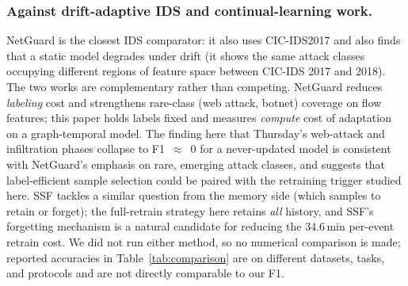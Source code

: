 \documentclass[twocolumn]{llncs}
\begin{document}
\subsubsection{Against drift-adaptive IDS and continual-learning work.} NetGuard
\cite{gupta2026netguard} is the closest IDS comparator: it also uses CIC-IDS2017 and also finds that
a static model degrades under drift (it shows the same attack classes occupying different regions of
feature space between CIC-IDS 2017 and 2018). The two works are complementary rather than competing.
NetGuard reduces \emph{labeling} cost and strengthens rare-class (web attack, botnet) coverage on
flow features; this paper holds labels fixed and measures \emph{compute} cost of adaptation on a
graph-temporal model. The finding here that Thursday's web-attack and infiltration phases collapse to
F1~$\approx$~0 for a never-updated model is consistent with NetGuard's emphasis on rare, emerging
attack classes, and suggests that label-efficient sample selection could be paired with the
retraining trigger studied here. SSF \cite{zhang2025ssf} tackles a similar question from the
memory side (which samples to retain or forget); the full-retrain strategy here retains \emph{all}
history, and SSF's forgetting mechanism is a natural candidate for reducing the 34.6\,min per-event
retrain cost. We did not run either method, so no numerical comparison is made; reported
accuracies in Table~\ref{tab:comparison} are on different datasets, tasks, and protocols and are not
directly comparable to our F1.
\end{document}
